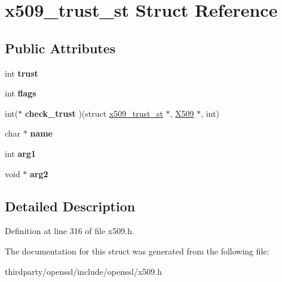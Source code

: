 \hypertarget{structx509__trust__st}{}\section{x509\+\_\+trust\+\_\+st Struct Reference}
\label{structx509__trust__st}
\subsection*{Public Attributes}
\begin{DoxyCompactItemize}
\item 
\mbox{\label{structx509__trust__st_a6840735427ee479d8796da9e838d6a77}} 
int {\bfseries trust}
\item 
\mbox{\label{structx509__trust__st_aee3ce09b9d6184cd66ad624b5689a676}} 
int {\bfseries flags}
\item 
\mbox{\label{structx509__trust__st_a416ceaadc539241699efb993fb2dc707}} 
int($\ast$ {\bfseries check\+\_\+trust} )(struct \hyperlink{structx509__trust__st}{x509\+\_\+trust\+\_\+st} $\ast$, \hyperlink{structx509__st}{X509} $\ast$, int)
\item 
\mbox{\label{structx509__trust__st_a31ddd3f516ef8144ef40285f8f8f304d}} 
char $\ast$ {\bfseries name}
\item 
\mbox{\label{structx509__trust__st_a97e2b1d9d69d10172d982776c337c6d9}} 
int {\bfseries arg1}
\item 
\mbox{\label{structx509__trust__st_af83753e80804cc408124be78954df1ef}} 
void $\ast$ {\bfseries arg2}
\end{DoxyCompactItemize}


\subsection{Detailed Description}


Definition at line 316 of file x509.\+h.



The documentation for this struct was generated from the following file\+:\begin{DoxyCompactItemize}
\item 
thirdparty/openssl/include/openssl/x509.\+h\end{DoxyCompactItemize}

